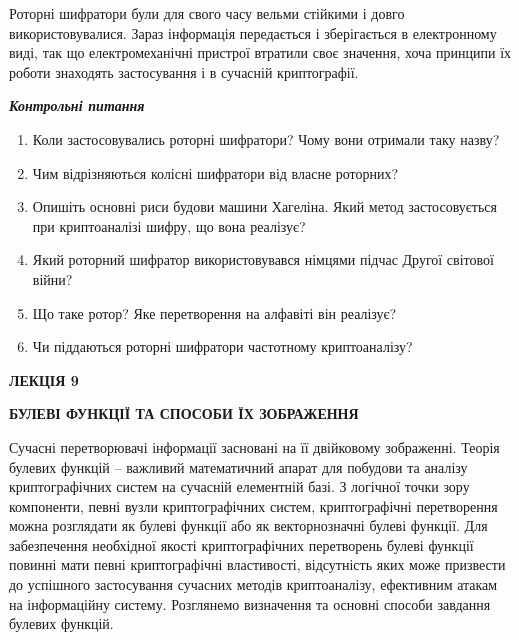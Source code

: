 \documentclass[a4paper]{article}
\newcommand\liststyleWWviiiNumxxxiv{%
\renewcommand\theenumi{\arabic{enumi}}
\renewcommand\theenumii{\alph{enumii}}
\renewcommand\theenumiii{\roman{enumiii}}
\renewcommand\theenumiv{\arabic{enumiv}}
\renewcommand\labelenumi{\theenumi.}
\renewcommand\labelenumii{\theenumii.}
\renewcommand\labelenumiii{\theenumiii.}
\renewcommand\labelenumiv{\theenumiv.}
}
\newcounter{}
\begin{document}
Роторні шифратори були для свого часу вельми стійкими і довго використовувалися.
Зараз інформація передається і зберігається в електронному виді, так що
електромеханічні пристрої втратили своє значення, хоча принципи їх роботи
знаходять застосування і в сучасній криптографії.


\bigskip

{\centering\bfseries\itshape
Контрольні питання
\par}


\bigskip


\bigskip

\liststyleWWviiiNumxxxiv
\begin{enumerate}
\item Коли застосовувались роторні шифратори? Чому вони отримали таку назву?
\item Чим відрізняються колісні шифратори від власне роторних?
\item Опишіть основні риси будови машини Хагеліна. Який метод застосовується при
криптоаналізі шифру, що вона реалізує?
\item Який роторний шифратор використовувався німцями підчас Другої світової
війни? 
\item Що таке ротор? Яке перетворення на алфавіті він реалізує?
\item Чи піддаються роторні шифратори частотному криптоаналізу?
\end{enumerate}

\bigskip


\bigskip


\bigskip

{\bfseries
 ЛЕКЦІЯ  9}


\bigskip

{\centering\bfseries
БУЛЕВІ  ФУНКЦІЇ  ТА  СПОСОБИ  ЇХ  ЗОБРАЖЕННЯ 
\par}


\bigskip


\bigskip

Сучасні перетворювачі інформації засновані на  її двійковому зображенні. Теорія
булевих функцій – важливий математичний апарат для побудови та аналізу
криптографічних систем на сучасній елементній базі. З логічної точки зору
компоненти, певні вузли криптографічних систем, криптографічні перетворення
можна розглядати як булеві функції або як векторнозначні булеві функції. Для
забезпечення необхідної якості криптографічних перетворень булеві функції
повинні мати певні криптографічні властивості, відсутність яких може призвести
до успішного застосування сучасних методів криптоаналізу, ефективним атакам на
інформаційну систему. Розглянемо визначення та основні способи завдання булевих
функцій.
\end{document}
